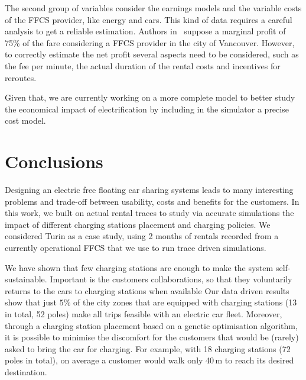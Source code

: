 The second group of variables consider the earnings models and the variable costs of the FFCS provider, like energy and cars. This kind of data requires a careful analysis to get a reliable estimation. Authors in~\cite{8_Wagner2015DataAF} suppose a marginal profit of 75\% of the fare considering a FFCS provider in the city of Vancouver. However, to correctly estimate the net profit several aspects need to be considered, such as the fee per minute, the actual duration of the rental costs and incentives for reroutes.

Given that, we are currently working on a more complete model to better study the economical impact of electrification by including in the simulator a precise cost model. 


\section{Conclusions}
\label{sec:conclusion}

Designing an electric free floating car sharing systems leads to many interesting problems and trade-off between usability, costs and benefits for the customers. 
In this work, we built on actual rental traces to study via accurate simulations the impact of different charging stations placement and charging policies. 
We considered Turin as a case study, using 2 months of rentals recorded from a currently operational FFCS that we use to run trace driven simulations.


We have shown that few charging stations are enough to make the system self-sustainable. Important is the customers collaborations, so that they voluntarily returns to the cars to charging stations when available
Our data driven results show that just $5\%$ of the city zones that are equipped with charging stations (13 in total, 52 poles) make all trips feasible with an electric car fleet. Moreover, through a charging station placement based on a genetic optimisation algorithm, it is possible to minimise the discomfort for the customers that would be (rarely) asked to bring the car for charging. For example, with 18 charging stations (72 poles in total), on average a customer would walk only 40\,m to reach its desired destination. 




